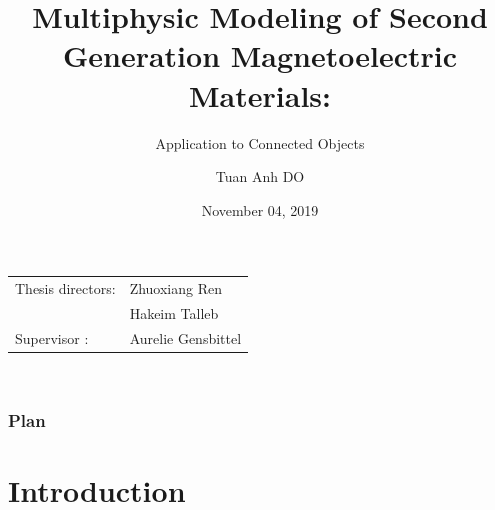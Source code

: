 \documentclass[compress]{beamer}
\author{Tuan Anh DO}
\title{\large Multiphysic Modeling of Second Generation Magnetoelectric Materials:}
\subtitle{Application to Connected Objects}
\institute{{\color{blue} \textbf{\large PhD Thesis Defense}}}
\date{{\color{letterfoot} November 04, 2019}}
\begin{document}
 
\begin{frame}[plain]
\maketitle
\small
\vspace*{0.5cm}
\centering
\begin{tabular}[t]{ll}
Thesis directors: & Zhuoxiang Ren \\ [0.2cm]
& Hakeim Talleb \\ [0.2cm]
Supervisor : & Aurelie Gensbittel \\
\end{tabular} \\
\end{frame}

\begin{frame}\frametitle{Plan}
\tableofcontents
\end{frame}


\section{Introduction}
\end{document}
